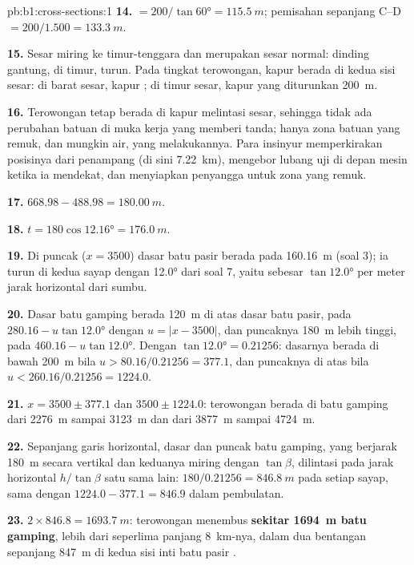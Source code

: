 \begin{solution}{pb:b1:cross-sections:1}
\textbf{14.}  $= 200/\tan\ang{60} = \qty{115.5}{m}$; pemisahan sepanjang C--D $= 200/1.500 = \qty{133.3}{m}$.

\textbf{15.} Sesar miring ke timur-tenggara dan merupakan sesar normal: dinding gantung, di timur, turun. Pada tingkat terowongan, kapur berada di kedua sisi sesar: di barat sesar, kapur ; di timur sesar, kapur yang diturunkan \qty{200}{m}.

\textbf{16.} Terowongan tetap berada di kapur melintasi sesar, sehingga tidak ada perubahan batuan di muka kerja yang memberi tanda; hanya zona batuan yang remuk, dan mungkin air, yang melakukannya. Para insinyur memperkirakan posisinya dari penampang (di sini \qty{7.22}{km}), mengebor lubang uji di depan mesin ketika ia mendekat, dan menyiapkan penyangga untuk zona yang remuk.

\textbf{17.} $668.98 - 488.98 = \qty{180.00}{m}$.

\textbf{18.} $t = 180\cos\ang{12.16} = \qty{176.0}{m}$.

\textbf{19.} Di puncak ($x = 3500$) dasar batu pasir berada pada \qty{160.16}{m} (soal 3); ia turun di kedua sayap dengan  \ang{12.0} dari soal 7, yaitu sebesar $\tan\ang{12.0}$ per meter jarak horizontal dari sumbu.

\textbf{20.} Dasar batu gamping berada \qty{120}{m} di atas dasar batu pasir, pada $280.16 - u\tan\ang{12.0}$ dengan $u = |x - 3500|$, dan puncaknya \qty{180}{m} lebih tinggi, pada $460.16 - u\tan\ang{12.0}$. Dengan $\tan\ang{12.0} =
0.21256$: dasarnya berada di bawah \qty{200}{m} bila $u > 80.16/0.21256 = 377.1$, dan puncaknya di atas bila $u < 260.16/0.21256 = 1224.0$.

\textbf{21.} $x = 3500 \pm 377.1$ dan $3500 \pm 1224.0$: terowongan berada di batu gamping dari \qty{2276}{m} sampai \qty{3123}{m} dan dari \qty{3877}{m} sampai \qty{4724}{m}.

\textbf{22.} Sepanjang garis horizontal, dasar dan puncak batu gamping, yang berjarak \qty{180}{m} secara vertikal dan keduanya miring dengan $\tan\beta$, dilintasi pada jarak horizontal $h/\tan\beta$ satu sama lain: $180/0.21256 = \qty{846.8}{m}$ pada setiap sayap, sama dengan $1224.0 - 377.1 = 846.9$ dalam pembulatan.

\textbf{23.} $2\times846.8 = \qty{1693.7}{m}$: terowongan menembus
\textbf{sekitar \qty[text-series-to-math=true]{1694}{m} batu gamping}, lebih dari seperlima panjang \qty{8}{km}-nya, dalam dua bentangan sepanjang \qty{847}{m} di kedua sisi inti batu pasir .
\end{solution}
